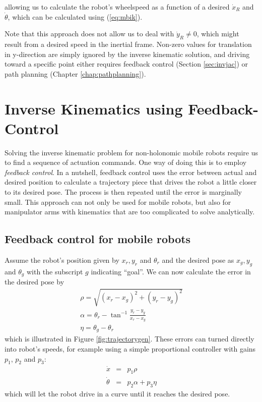 allowing us to calculate the robot's wheelspeed as a function of a desired $\dot{x}_R$ and $\dot{\theta}$, which can be calculated using (\ref{eq:mbik}).

Note that this approach does not allow us to deal with $\dot{y}_R \neq 0$, which might result from a desired speed in the inertial frame. Non-zero values for translation in y-direction are simply ignored by the inverse kinematic solution, and driving toward a specific point either requires feedback control (Section \ref{sec:invjac}) or path planning (Chapter \ref{chap:pathplanning}). 


\section{Inverse Kinematics using Feedback-Control}\label{sec:advinvkinematics}
Solving the inverse kinematic problem for non-holonomic mobile robots require us to find a sequence of actuation commands. One way of doing this is to employ \emph{feedback control}. In a nutshell, feedback control uses the error between actual and desired position to calculate a trajectory piece that drives the robot a little closer to its desired pose. The process is then repeated until the error is marginally small. This approach can not only be used for mobile robots, but also for manipulator arms with kinematics that are too complicated to solve analytically. 

\subsection{Feedback control for mobile robots}
Assume the robot's position given by $x_r, y_r$ and $\theta_r$ and the desired pose as $x_g, y_g$ and $\theta_g$ with the subscript $g$ indicating ``goal''.
We can now calculate the error in the desired pose by
\begin{eqnarray}
\rho=\sqrt{(x_r-x_g)^2+(y_r-y_g)^2}\\
\nonumber
\alpha=\theta_r-\tan^{-1}{\frac{y_r-y_g}{x_r-x_g}}\\
\nonumber
\eta=\theta_g-\theta_r
\end{eqnarray}
which is illustrated in Figure \ref{fig:trajectorygen}.
These errors can turned directly into robot's speeds, for example using a simple proportional controller with gains $p_1$, $p_2$ and $p_3$: 
\begin{eqnarray}
\dot{x} &=& p_1 \rho\\
\dot{\theta} &=& p_2 \alpha + p_3 \eta
\end{eqnarray}
which will let the robot drive in a curve until it reaches the desired pose. 

